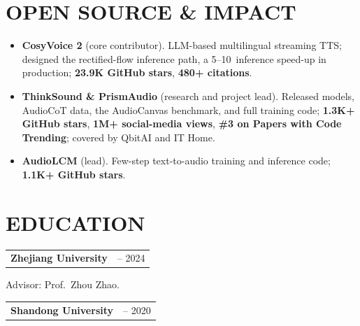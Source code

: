 \documentclass[10pt,letterpaper]{article}
\makeatletter
\newcommand{\entry}[3]{\par\noindent\begin{tabularx}{\textwidth}{@{}Xr@{}}
  {\bfseries #1}\quad{\color{muted}#2} & {\color{muted}\sffamily\fontsize{9.5}{12}\selectfont #3}\\
  \end{tabularx}\par\nobreak\vspace{-2pt}}
\makeatother
\begin{document}
\section{OPEN SOURCE \& IMPACT}
\begin{itemize}
  \item \textbf{CosyVoice 2} (core contributor). LLM-based multilingual streaming TTS; designed the rectified-flow inference path, a 5--10\texttimes\ inference speed-up in production; \textbf{23.9K GitHub stars}, \textbf{480+ citations}.
  \item \textbf{ThinkSound \& PrismAudio} (research and project lead). Released models, AudioCoT data, the AudioCanvas benchmark, and full training code; \textbf{1.3K+ GitHub stars}, \textbf{1M+ social-media views}, \textbf{\#3 on Papers with Code Trending}; covered by QbitAI and IT Home.
  \item \textbf{AudioLCM} (lead). Few-step text-to-audio training and inference code; \textbf{1.1K+ GitHub stars}.
\end{itemize}

\section{EDUCATION}
\entry{Zhejiang University}{M.S.\ in Artificial Intelligence}{2021 -- 2024}
{\color{muted}Advisor: Prof.\ Zhou Zhao.}\par\vspace{4pt plus 2pt}
\entry{Shandong University}{B.S.\ in Electronic Information}{2016 -- 2020}

\pagebreak
\fontsize{10}{12.2}\selectfont
\end{document}
